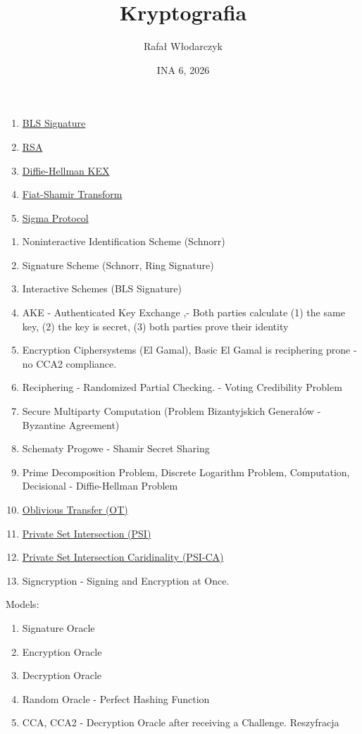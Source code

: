 \documentclass{article}
\title{Kryptografia}
\author{Rafał Włodarczyk}
\date{INA 6, 2026}
\numberwithin{equation}{subsection}
\begin{document}
\maketitle

\begin{enumerate}
    \item \href{https://en.wikipedia.org/wiki/BLS_digital_signature}{BLS Signature}
    \item \href{}{RSA}
    \item \href{}{Diffie-Hellman KEX}
    \item \href{https://www.zkdocs.com/docs/zkdocs/protocol-primitives/fiat-shamir/}{Fiat-Shamir Transform}
    \item \href{https://crypto.stanford.edu/cs355/19sp/lec6.pdf}{Sigma Protocol}
\end{enumerate}

\begin{enumerate}
    \item Noninteractive Identification Scheme (Schnorr)
    \item Signature Scheme (Schnorr, Ring Signature)
    \item Interactive Schemes (BLS Signature)
    \item AKE - Authenticated Key Exchange ,- Both parties calculate (1) the same key, (2) the key is secret, (3) both parties prove their identity
    \item Encryption Ciphersystems (El Gamal), Basic El Gamal is reciphering prone - no CCA2 compliance. 
    \item Reciphering - Randomized Partial Checking. - Voting Credibility Problem
    \item Secure Multiparty Computation (Problem Bizantyjskich Generałów - Byzantine Agreement)
    \item Schematy Progowe - Shamir Secret Sharing
    \item Prime Decomposition Problem, Discrete Logarithm Problem, Computation, Decisional - Diffie-Hellman Problem
    \item \href{https://en.wikipedia.org/wiki/Oblivious_transfer}{Oblivious Transfer (OT)}
    \item \href{https://en.wikipedia.org/wiki/Private_set_intersection}{Private Set Intersection (PSI)}
    \item \href{https://www.usenix.org/conference/usenixsecurity23/presentation/wu-mingli}{Private Set Intersection Caridinality (PSI-CA)}
    \item Signcryption - Signing and Encryption at Once.
\end{enumerate}

Models:

\begin{enumerate}
    \item Signature Oracle
    \item Encryption Oracle
    \item Decryption Oracle
    \item Random Oracle - Perfect Hashing Function
    \item CCA, CCA2 - Decryption Oracle after receiving a Challenge. Reszyfracja
\end{enumerate}
\end{document}
